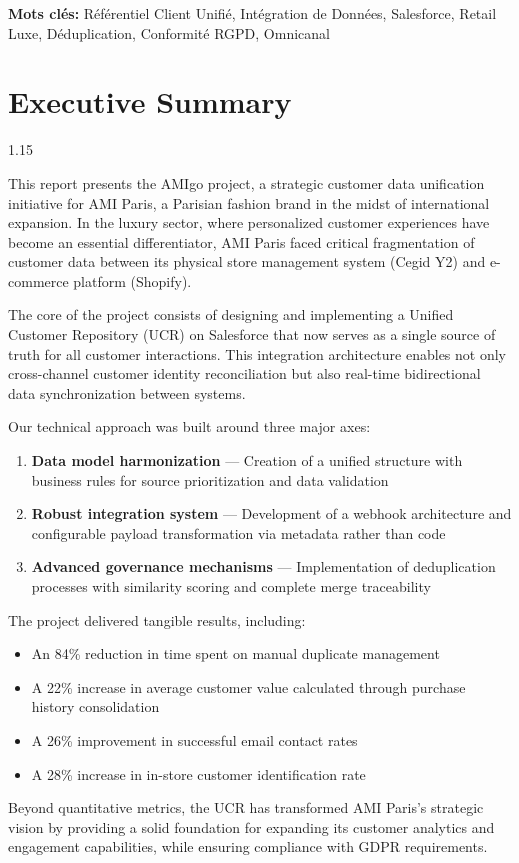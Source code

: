 \documentclass[12pt,a4paper,openany,oneside]{report}
\begin{document}
\vspace{0.5cm}
\noindent\textbf{Mots clés:} Référentiel Client Unifié, Intégration de Données, Salesforce, Retail Luxe, Déduplication, Conformité RGPD, Omnicanal

\chapter*{Executive Summary}
\thispagestyle{plain}

\begin{spacing}{1.15}
\normalsize

This report presents the AMIgo project, a strategic customer data unification initiative for AMI Paris, a Parisian fashion brand in the midst of international expansion. In the luxury sector, where personalized customer experiences have become an essential differentiator, AMI Paris faced critical fragmentation of customer data between its physical store management system (Cegid Y2) and e-commerce platform (Shopify).

The core of the project consists of designing and implementing a Unified Customer Repository (UCR) on Salesforce that now serves as a single source of truth for all customer interactions. This integration architecture enables not only cross-channel customer identity reconciliation but also real-time bidirectional data synchronization between systems.

Our technical approach was built around three major axes:

\begin{enumerate}
    \item \textbf{Data model harmonization} — Creation of a unified structure with business rules for source prioritization and data validation
    \item \textbf{Robust integration system} — Development of a webhook architecture and configurable payload transformation via metadata rather than code
    \item \textbf{Advanced governance mechanisms} — Implementation of deduplication processes with similarity scoring and complete merge traceability
\end{enumerate}

The project delivered tangible results, including:
\begin{itemize}\itemsep0em
  \item An 84\% reduction in time spent on manual duplicate management
  \item A 22\% increase in average customer value calculated through purchase history consolidation
  \item A 26\% improvement in successful email contact rates
  \item A 28\% increase in in-store customer identification rate
\end{itemize}

Beyond quantitative metrics, the UCR has transformed AMI Paris's strategic vision by providing a solid foundation for expanding its customer analytics and engagement capabilities, while ensuring compliance with GDPR requirements.

\end{spacing}
\end{document}

